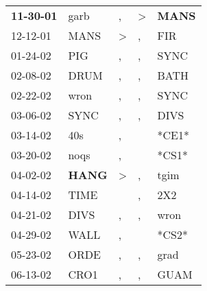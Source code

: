 \begin{supertabular}{p{0.07\textwidth}p{0.06\textwidth}p{0.02\textwidth}p{0.02\textwidth}p{0.06\textwidth}}
 \textbf{11-30-01\textsuperscript{}} &           garb\textsuperscript{} &                , &     \textgreater &  \textbf{MANS\textsuperscript{}} \\
          12-12-01\textsuperscript{} &           MANS\textsuperscript{} &     \textgreater &                , &            FIR\textsuperscript{} \\
          01-24-02\textsuperscript{} &            PIG\textsuperscript{} &                , &                , &           SYNC\textsuperscript{} \\
          02-08-02\textsuperscript{} &           DRUM\textsuperscript{} &                , &                , &           BATH\textsuperscript{} \\
          02-22-02\textsuperscript{} &           wron\textsuperscript{} &                , &                , &           SYNC\textsuperscript{} \\
          03-06-02\textsuperscript{} &           SYNC\textsuperscript{} &                , &                , &           DIVS\textsuperscript{} \\
          03-14-02\textsuperscript{} &            40s\textsuperscript{} &                , &                  &                            *CE1* \\
          03-20-02\textsuperscript{} &           noqs\textsuperscript{} &                , &                  &                            *CS1* \\
          04-02-02\textsuperscript{} &  \textbf{HANG\textsuperscript{}} &     \textgreater &                , &           tgim\textsuperscript{} \\
          04-14-02\textsuperscript{} &           TIME\textsuperscript{} &                  &                , &            2X2\textsuperscript{} \\
          04-21-02\textsuperscript{} &           DIVS\textsuperscript{} &                , &                , &           wron\textsuperscript{} \\
          04-29-02\textsuperscript{} &           WALL\textsuperscript{} &                , &                  &                            *CS2* \\
          05-23-02\textsuperscript{} &           ORDE\textsuperscript{} &                , &                , &           grad\textsuperscript{} \\
          06-13-02\textsuperscript{} &           CRO1\textsuperscript{} &                , &                , &           GUAM\textsuperscript{} \\

\end{supertabular}
